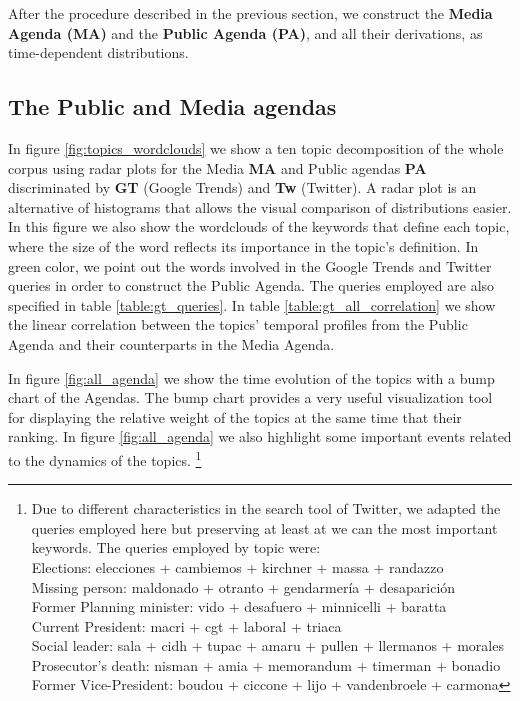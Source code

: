 \documentclass[10pt,letterpaper]{article}
\begin{document}
\par After the procedure described in the previous section, we construct the \textbf{Media Agenda (MA)} and the \textbf{Public Agenda (PA)}, and all their derivations, as time-dependent distributions. 

\subsection*{The Public and Media agendas}

\par In figure \ref{fig:topics_wordclouds} we show a ten topic decomposition of the whole corpus using radar plots for the Media \textbf{MA} and Public agendas \textbf{PA} discriminated by \textbf{GT} (Google Trends) and \textbf{Tw} (Twitter). A radar plot is an alternative of histograms that allows the visual comparison of distributions easier.
In this figure we also show the wordclouds of the keywords that define each topic, where the size of the word reflects its importance in the topic's definition. In green color, we point out the words involved in the Google Trends and Twitter queries in order to construct the Public Agenda. The queries employed are also specified in table \ref{table:gt_queries}. In table \ref{table:gt_all_correlation} we show the linear correlation between the topics' temporal profiles from the Public Agenda and their counterparts in the Media Agenda.

\par In figure \ref{fig:all_agenda} we show the time evolution of the topics with a bump chart of the Agendas. The bump chart provides  a very useful visualization tool for displaying the relative weight of the topics at the same time that their ranking. In figure \ref{fig:all_agenda} we also highlight some important events related to the dynamics of the topics. \footnote{Due to different characteristics in the search tool of Twitter, we adapted the queries employed here but preserving at least at we can the most important keywords. The queries employed by topic were: \\
Elections: elecciones + cambiemos + kirchner + massa + randazzo \\
Missing person: maldonado + otranto + gendarmer\'ia + desaparici\'on \\
Former Planning minister: vido + desafuero + minnicelli + baratta \\
Current President: macri + cgt + laboral +  triaca \\
Social leader:  sala + cidh + tupac + amaru + pullen + llermanos + morales \\
Prosecutor’s death: nisman + amia + memorandum + timerman +  bonadio \\
Former Vice-President:  boudou + ciccone +  lijo + vandenbroele + carmona
}
\end{document}
